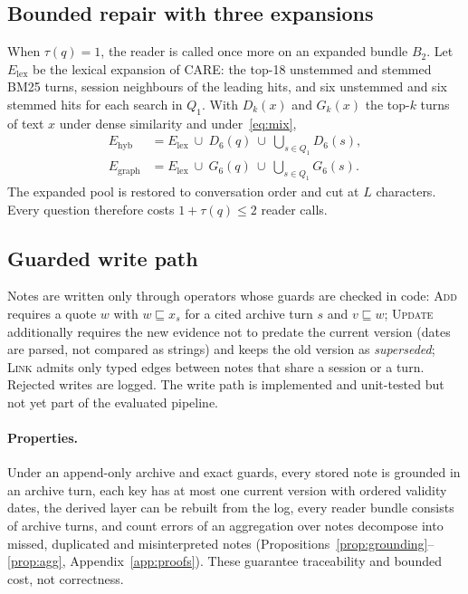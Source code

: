 \documentclass[10pt]{article}
\theoremstyle{plain}
\theoremstyle{definition}
\newcommand{\care}{\textsc{CARE}}
\newcommand{\sub}{\sqsubseteq}
\begin{document}
\subsection{Bounded repair with three expansions}
\label{sec:repair}

When $\tau(q)=1$, the reader is called once more on an expanded bundle $B_2$. Let $E_{\mathrm{lex}}$ be the
lexical expansion of \care{}: the top-18 unstemmed and stemmed BM25 turns, session neighbours of the
leading hits, and six unstemmed and six stemmed hits for each search in $Q_1$. With $D_k(x)$ and
$G_k(x)$ the top-$k$ turns of text $x$ under dense similarity and under~\eqref{eq:mix},
\begin{align}
E_{\mathrm{hyb}}&=E_{\mathrm{lex}}\ \cup\ D_6(q)\ \cup\ \textstyle\bigcup_{s\in Q_1}D_6(s), \label{eq:hyb}\\
E_{\mathrm{graph}}&=E_{\mathrm{lex}}\ \cup\ G_6(q)\ \cup\ \textstyle\bigcup_{s\in Q_1}G_6(s). \label{eq:graphrep}
\end{align}
The expanded pool is restored to conversation order and cut at $L$ characters. Every question therefore
costs $1+\tau(q)\le2$ reader calls.

\subsection{Guarded write path}

Notes are written only through operators whose guards are checked in code: \textsc{Add} requires a
quote $w$ with $w\sub x_s$ for a cited archive turn $s$ and $v\sub w$; \textsc{Update} additionally
requires the new evidence not to predate the current version (dates are parsed, not compared as strings)
and keeps the old version as \emph{superseded}; \textsc{Link} admits only typed edges between notes that
share a session or a turn. Rejected writes are logged. The write path is implemented and unit-tested but
not yet part of the evaluated pipeline.

\paragraph{Properties.} Under an append-only archive and exact guards, every stored note is grounded in
an archive turn, each key has at most one current version with ordered validity dates, the derived layer
can be rebuilt from the log, every reader bundle consists of archive turns, and count errors of an
aggregation over notes decompose into missed, duplicated and misinterpreted notes
(Propositions~\ref{prop:grounding}--\ref{prop:agg}, Appendix~\ref{app:proofs}). These guarantee
traceability and bounded cost, not correctness.
\end{document}
